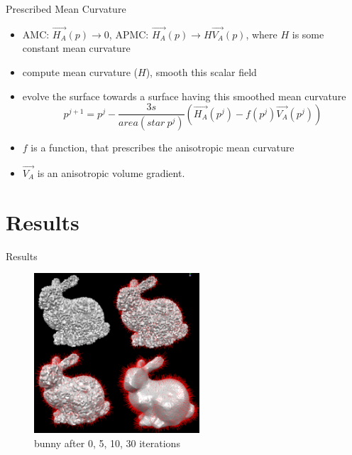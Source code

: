 \documentclass{beamer}
\begin{document}
\begin{frame}{Prescribed Mean Curvature}
\begin{itemize}
\item AMC: $\vec{H_A}(p) \rightarrow 0$, APMC: $\vec{H_A}(p) \rightarrow H\vec{V_A}(p)$, where $H$ is some constant mean curvature
\item compute mean curvature ($H$), smooth this scalar field
\item evolve the surface towards a surface having this smoothed mean curvature
\begin{equation*}
p^{j+1} = p^{j} - \dfrac{3s}{area(star\ p^j)}(\vec{H_A}(p^j) - f(p^j)\vec{V_A}(p^j))
\end{equation*}
\item $f$ is a function, that prescribes the anisotropic mean curvature
\item $\vec{V_A}$ is an anisotropic volume gradient.
\end{itemize}
\end{frame}


\section{Results}

\begin{frame}{Results}
\begin{figure}[htb]
\centering
\includegraphics[width=0.55\textwidth]{bunnies_1_10_30_raw.PNG}
\caption{bunny after 0, 5, 10, 30 iterations}
\label{fig:bunny0_1_10_30}
\end{figure}
\end{frame}
\end{document}
